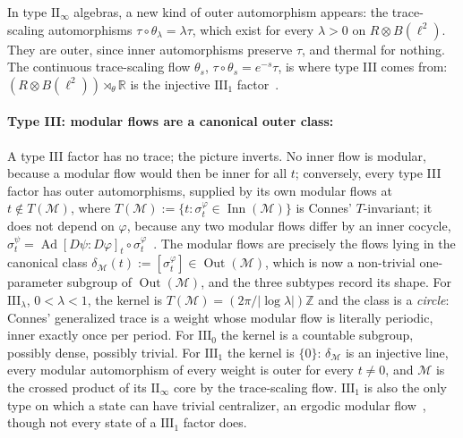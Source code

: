 \documentclass[a4paper,11pt]{article}
\theoremstyle{definition}
\begin{document}

In type $\mathrm{II}_\infty$ algebras, a new kind of outer automorphism appears: the trace-scaling automorphisms $\tau\circ\theta_\lambda=\lambda\tau$, which exist for every $\lambda>0$ on $R\otimes B(\ell^2)$. They are outer, since inner automorphisms preserve $\tau$, and thermal for nothing. The continuous trace-scaling flow $\theta_s$, $\tau\circ\theta_s=e^{-s}\tau$, is where type III comes from: $(R\otimes B(\ell^2))\rtimes_\theta\mathbb R$ is the injective $\mathrm{III}_1$ factor~\cite{ConnesTakesaki1977,Haagerup1987}.

\paragraph{Type III: modular flows are a canonical outer class:}
A type III factor has no trace; the picture inverts. No inner flow is modular, because a modular flow would then be inner for all $t$; conversely, every type III factor has outer automorphisms, supplied by its own modular flows at $t\notin T(\mathcal M)$, where $T(\mathcal M):=\{t:\sigma^\varphi_t\in\operatorname{Inn}(\mathcal M)\}$ is Connes' $T$-invariant; it does not depend on $\varphi$, because any two modular flows differ by an inner cocycle, $\sigma^\psi_t=\operatorname{Ad}[D\psi:D\varphi]_t\circ\sigma^\varphi_t$~\cite{Connes1973}. The modular flows are precisely the flows lying in the canonical class $\delta_{\mathcal M}(t):=[\sigma^\varphi_t]\in\operatorname{Out}(\mathcal M)$, which is now a non-trivial one-parameter subgroup of $\operatorname{Out}(\mathcal M)$, and the three subtypes record its shape. For $\mathrm{III}_\lambda$, $0<\lambda<1$, the kernel is $T(\mathcal M)=(2\pi/|\log\lambda|)\mathbb Z$ and the class is a \emph{circle}: Connes' generalized trace is a weight whose modular flow is literally periodic, inner exactly once per period. For $\mathrm{III}_0$ the kernel is a countable subgroup, possibly dense, possibly trivial. For $\mathrm{III}_1$ the kernel is $\{0\}$: $\delta_{\mathcal M}$ is an injective line, every modular automorphism of every weight is outer for every $t\ne0$, and $\mathcal M$ is the crossed product of its $\mathrm{II}_\infty$ core by the trace-scaling flow. $\mathrm{III}_1$ is also the only type on which a state can have trivial centralizer, an ergodic modular flow~\cite{Connes1973,Longo1982}, though not every state of a $\mathrm{III}_1$ factor does.
\end{document}
